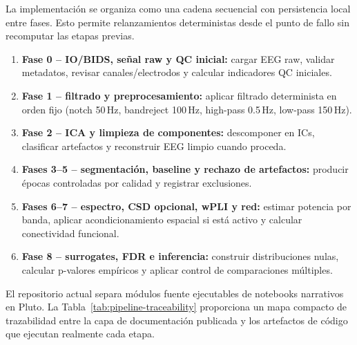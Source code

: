La implementación se organiza como una cadena secuencial con persistencia local entre fases. Esto permite relanzamientos deterministas desde el punto de fallo sin recomputar las etapas previas.

\begin{tcolorbox}[
  enhanced,
  breakable,
  colback=blue!2,
  colframe=blue!55!black,
  coltitle=black,
  boxrule=0.6pt,
  arc=2mm,
  left=1.2mm,
  right=1.2mm,
  top=1mm,
  bottom=1mm,
  title=\textbf{Fases del pipeline y orden de ejecución}
]
\begin{enumerate}[leftmargin=*,itemsep=2pt,topsep=2pt]
\item \textbf{Fase 0 -- IO/BIDS, señal raw y QC inicial:} cargar EEG raw, validar metadatos, revisar canales/electrodos y calcular indicadores QC iniciales.
\item \textbf{Fase 1 -- filtrado y preprocesamiento:} aplicar filtrado determinista en orden fijo (notch 50\,Hz, bandreject 100\,Hz, high-pass 0.5\,Hz, low-pass 150\,Hz).
\item \textbf{Fase 2 -- ICA y limpieza de componentes:} descomponer en ICs, clasificar artefactos y reconstruir EEG limpio cuando proceda.
\item \textbf{Fases 3--5 -- segmentación, baseline y rechazo de artefactos:} producir épocas controladas por calidad y registrar exclusiones.
\item \textbf{Fases 6--7 -- espectro, CSD opcional, wPLI y red:} estimar potencia por banda, aplicar acondicionamiento espacial si está activo y calcular conectividad funcional.
\item \textbf{Fase 8 -- surrogates, FDR e inferencia:} construir distribuciones nulas, calcular p-valores empíricos y aplicar control de comparaciones múltiples.
\end{enumerate}
\end{tcolorbox}

El repositorio actual separa módulos fuente ejecutables de notebooks narrativos en Pluto. La Tabla~\ref{tab:pipeline-traceability} proporciona un mapa compacto de trazabilidad entre la capa de documentación publicada y los artefactos de código que ejecutan realmente cada etapa.

